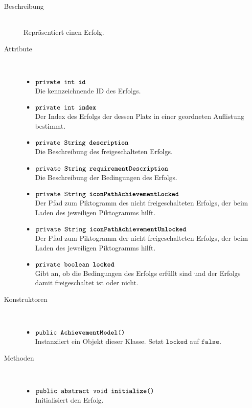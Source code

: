\begin{description}
\item[Beschreibung] \hfill \\ Repräsentiert einen Erfolg.
\item[Attribute] \hfill \\
	\vspace{-.8cm}
	\begin{itemize}
		\item $\texttt{private int \textbf{id}}$ \\ Die kennzeichnende ID des Erfolgs.
		\item $\texttt{private int \textbf{index}}$ \\ Der Index des Erfolgs der dessen Platz in einer geordneten Auflistung bestimmt.
		\item $\texttt{private String \textbf{description}}$ \\ Die Beschreibung des freigeschalteten Erfolgs.
		\item $\texttt{private String \textbf{requirementDescription}}$ \\ Die Beschreibung der Bedingungen des Erfolgs.
		\item $\texttt{private String \textbf{iconPathAchievementLocked}}$ \\Der Pfad zum Piktogramm des nicht freigeschalteten Erfolgs, der beim Laden des jeweiligen Piktogramms hilft.
		\item $\texttt{private String \textbf{iconPathAchievementUnlocked}}$ \\ Der Pfad zum Piktogramm der nicht freigeschalteten Erfolgs, der beim Laden des jeweiligen Piktogramms hilft.
		\item $\texttt{private boolean \textbf{locked}}$ \\ Gibt an, ob die Bedingungen des Erfolgs erfüllt sind und der Erfolgs damit freigeschaltet ist oder nicht.
	\end{itemize}
	
\item[Konstruktoren] \hfill \\
	\vspace{-.8cm}
	\begin{itemize}
		\item $\texttt{public \textbf{AchievementModel}()}$ \\ Instanziiert ein Objekt dieser Klasse. Setzt $\texttt{locked}$ auf $\texttt{false}$.
	\end{itemize}
	
\item[Methoden] \hfill \\
	\vspace{-.8cm}
	\begin{itemize}
		\item $\texttt{public abstract void \textbf{initialize}()}$ \\ Initialisiert den Erfolg.
		

\end{itemize}
\end{description}
